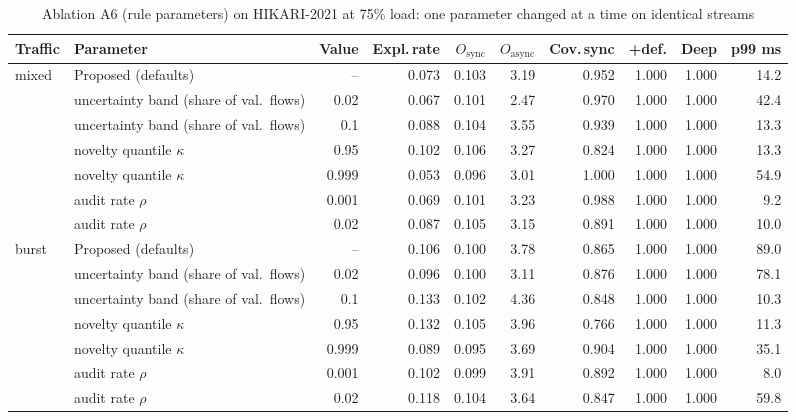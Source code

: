 \begin{table}[!htbp]
\centering
\caption{Ablation A6 (rule parameters) on HIKARI-2021 at 75\% load: one parameter changed at a time on identical streams}
\label{tab:sens:hikari_XGB_T3}
\scriptsize
\setlength{\tabcolsep}{3.5pt}
\begin{tabular}{llrrrrrrrr}
\toprule
\textbf{Traffic} & \textbf{Parameter} & \textbf{Value} & \textbf{Expl.\,rate} & \textbf{$O_{\mathrm{sync}}$} & \textbf{$O_{\mathrm{async}}$} & \textbf{Cov.\,sync} & \textbf{+def.} & \textbf{Deep} & \textbf{p99 ms} \\
\midrule
mixed & Proposed (defaults) & -- & 0.073 & 0.103 & 3.19 & 0.952 & 1.000 & 1.000 & 14.2 \\
 & uncertainty band (share of val.\ flows) & 0.02 & 0.067 & 0.101 & 2.47 & 0.970 & 1.000 & 1.000 & 42.4 \\
 & uncertainty band (share of val.\ flows) & 0.1 & 0.088 & 0.104 & 3.55 & 0.939 & 1.000 & 1.000 & 13.3 \\
 & novelty quantile $\kappa$ & 0.95 & 0.102 & 0.106 & 3.27 & 0.824 & 1.000 & 1.000 & 13.3 \\
 & novelty quantile $\kappa$ & 0.999 & 0.053 & 0.096 & 3.01 & 1.000 & 1.000 & 1.000 & 54.9 \\
 & audit rate $\rho$ & 0.001 & 0.069 & 0.101 & 3.23 & 0.988 & 1.000 & 1.000 & 9.2 \\
 & audit rate $\rho$ & 0.02 & 0.087 & 0.105 & 3.15 & 0.891 & 1.000 & 1.000 & 10.0 \\
\midrule
burst & Proposed (defaults) & -- & 0.106 & 0.100 & 3.78 & 0.865 & 1.000 & 1.000 & 89.0 \\
 & uncertainty band (share of val.\ flows) & 0.02 & 0.096 & 0.100 & 3.11 & 0.876 & 1.000 & 1.000 & 78.1 \\
 & uncertainty band (share of val.\ flows) & 0.1 & 0.133 & 0.102 & 4.36 & 0.848 & 1.000 & 1.000 & 10.3 \\
 & novelty quantile $\kappa$ & 0.95 & 0.132 & 0.105 & 3.96 & 0.766 & 1.000 & 1.000 & 11.3 \\
 & novelty quantile $\kappa$ & 0.999 & 0.089 & 0.095 & 3.69 & 0.904 & 1.000 & 1.000 & 35.1 \\
 & audit rate $\rho$ & 0.001 & 0.102 & 0.099 & 3.91 & 0.892 & 1.000 & 1.000 & 8.0 \\
 & audit rate $\rho$ & 0.02 & 0.118 & 0.104 & 3.64 & 0.847 & 1.000 & 1.000 & 59.8 \\
\bottomrule
\end{tabular}
\end{table}
